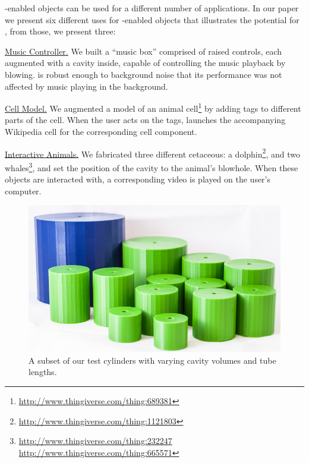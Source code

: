             \bh-enabled objects can be used for a different number of
            applications. In our paper we present six different uses for
            \bh-enabled objects that illustrates the potential for \bh, from
            those, we present three:

            \underline{Music Controller.} We built a ``music box'' comprised of
              raised controls, each augmented with a \bh cavity inside, capable
              of controlling the music playback by blowing. \bh is robust enough
              to background noise that its performance was not affected by music
              playing in the background.

            \underline{Cell Model.} We augmented a model of an animal
              cell\footnote{\url{http://www.thingiverse.com/thing:689381}} by
              adding \bh tags to different parts of the cell. When the user acts
              on the tags, \bh launches the accompanying Wikipedia cell for the
              corresponding cell component.

            \underline{Interactive Animals.} We fabricated three different
              cetaceous: a
              dolphin\footnote{\url{http://www.thingiverse.com/thing:1121803}},
              and two
              whales\footnote{\url{http://www.thingiverse.com/thing:232247}\\
              \url{http://www.thingiverse.com/thing:665571}}, and set the
              position of the cavity to the animal's blowhole. When these objects
              are interacted with, a corresponding video is played on the user's
              computer.

            \begin{figure}
              \centering
              \includegraphics[width=.95\columnwidth]{figures/cylinders.jpg}
              \caption{A subset of our test cylinders with varying cavity
                volumes and tube lengths.}
              \label{fig:cylinders}
            \end{figure}

